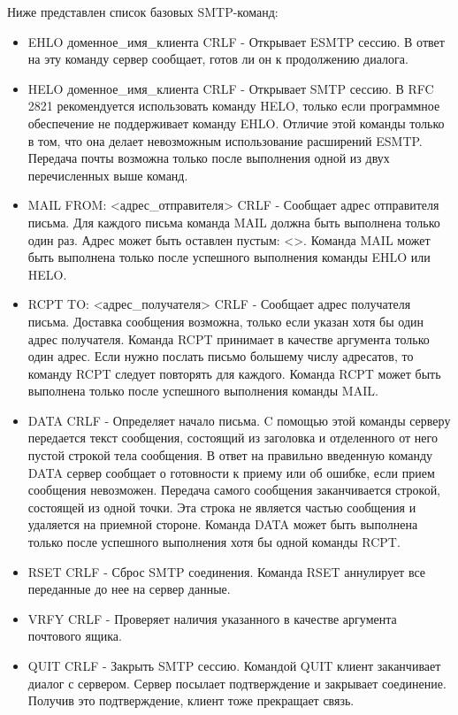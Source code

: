 \documentclass[a4paper,12pt]{report}
\begin{document}
Ниже представлен список базовых SMTP-команд:
\begin{itemize}
    \item EHLO доменное\_имя\_клиента CRLF - Открывает ESMTP сессию. В ответ на эту команду сервер сообщает, готов ли он к продолжению диалога.
    \item HELO доменное\_имя\_клиента CRLF - Открывает SMTP сессию. В RFC 2821 рекомендуется использовать команду HELO, только если программное обеспечение не поддерживает команду EHLO. Отличие этой команды только в том, что она делает невозможным использование расширений ESMTP. Передача почты возможна только после выполнения одной из двух перечисленных выше команд.
    \item MAIL FROM: <адрес\_отправителя> CRLF - Сообщает адрес отправителя письма. Для каждого письма команда MAIL должна быть выполнена только один раз. Адрес может быть оставлен пустым: <>. Команда MAIL может быть выполнена только после успешного выполнения команды EHLO или HELO.
    \item RCPT TO: <адрес\_получателя> CRLF - Сообщает адрес получателя письма. Доставка сообщения возможна, только если указан хотя бы один адрес получателя. Команда RCPT принимает в качестве аргумента только один адрес. Если нужно послать письмо большему числу адресатов, то команду RCPT следует повторять для каждого. Команда RCPT может быть выполнена только после успешного выполнения команды MAIL.
    \item DATA CRLF - Определяет начало письма. C помощью этой команды серверу передается текст сообщения, состоящий из заголовка и отделенного от него пустой строкой тела сообщения. В ответ на правильно введенную команду DATA сервер сообщает о готовности к приему или об ошибке, если прием сообщения невозможен. Передача самого сообщения заканчивается строкой, состоящей из одной точки. Эта строка не является частью сообщения и удаляется на приемной стороне. Команда DATA может быть выполнена только после успешного выполнения хотя бы одной команды RCPT.
    \item RSET CRLF - Сброс SMTP соединения. Команда RSET аннулирует все переданные до нее на сервер данные.
    \item VRFY CRLF - Проверяет наличия указанного в качестве аргумента почтового ящика.
    \item QUIT CRLF - Закрыть SMTP сессию. Командой QUIT клиент заканчивает диалог с сервером. Сервер посылает подтверждение и закрывает соединение. Получив это подтверждение, клиент тоже прекращает связь.
\end{itemize}
\end{document}
